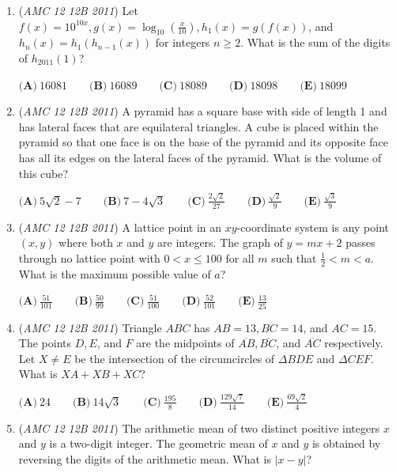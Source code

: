 \begin{enumerate}
 $\textbf{(A)}\ \frac{\sqrt{3}}{3} \qquad \textbf{(B)}\ \frac{\sqrt{3}}{2} \qquad \textbf{(C)}\ \frac{2\sqrt{3}}{3} \qquad \textbf{(D)}\ 1 + \frac{\sqrt{3}}{3} \qquad \textbf{(E)}\ 2$


	\item (\textit{AMC 12 12B 2011}) Let $f(x) = 10^{10x}, g(x) = \log_{10}\left(\frac{x}{10}\right), h_1(x) = g(f(x))$, and $h_n(x) = h_1(h_{n-1}(x))$ for integers $n \geq 2$. What is the sum of the digits of $h_{2011}(1)$?


 $\textbf{(A)}\ 16081 \qquad \textbf{(B)}\ 16089 \qquad \textbf{(C)}\ 18089 \qquad \textbf{(D)}\ 18098 \qquad \textbf{(E)}\ 18099$


	\item (\textit{AMC 12 12B 2011}) A pyramid has a square base with side of length 1 and has lateral faces that are equilateral triangles. A cube is placed within the pyramid so that one face is on the base of the pyramid and its opposite face has all its edges on the lateral faces of the pyramid. What is the volume of this cube?


 $\textbf{(A)}\ 5\sqrt{2} - 7 \qquad \textbf{(B)}\ 7 - 4\sqrt{3} \qquad \textbf{(C)}\ \frac{2\sqrt{2}}{27} \qquad \textbf{(D)}\ \frac{\sqrt{2}}{9} \qquad \textbf{(E)}\ \frac{\sqrt{3}}{9}$


	\item (\textit{AMC 12 12B 2011}) A lattice point in an $xy$-coordinate system is any point $(x, y)$ where both $x$ and $y$ are integers. The graph of $y = mx + 2$ passes through no lattice point with $0 < x \leq 100$ for all $m$ such that $\frac{1}{2} < m < a$. What is the maximum possible value of $a$?


 $\textbf{(A)}\ \frac{51}{101} \qquad \textbf{(B)}\ \frac{50}{99} \qquad \textbf{(C)}\ \frac{51}{100} \qquad \textbf{(D)}\ \frac{52}{101} \qquad \textbf{(E)}\ \frac{13}{25}$


	\item (\textit{AMC 12 12B 2011}) Triangle $ABC$ has $AB = 13, BC = 14$, and $AC = 15$. The points $D, E$, and $F$ are the midpoints of $\overline{AB}, \overline{BC}$, and $\overline{AC}$ respectively. Let $X \not= E$ be the intersection of the circumcircles of $\Delta BDE$ and $\Delta CEF$. What is $XA + XB + XC$?


 $\textbf{(A)}\ 24 \qquad \textbf{(B)}\ 14\sqrt{3} \qquad \textbf{(C)}\ \frac{195}{8} \qquad \textbf{(D)}\ \frac{129\sqrt{7}}{14} \qquad \textbf{(E)}\ \frac{69\sqrt{2}}{4}$


	\item (\textit{AMC 12 12B 2011}) The arithmetic mean of two distinct positive integers $x$ and $y$ is a two-digit integer. The geometric mean of $x$ and $y$ is obtained by reversing the digits of the arithmetic mean. What is $|x - y|$?



\end{enumerate}
